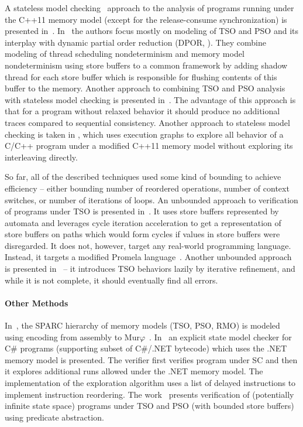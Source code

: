 A stateless model checking~\cite{Godefroid1997} approach to the analysis of programs running under the C++11 memory model (except for the release-consume synchronization) is presented in~\cite{Norris2013}.
In~\cite{Zhang2015} the authors focus mostly on modeling of TSO and PSO and its interplay with dynamic partial order reduction (DPOR, \cite{Flanagan2005dpor}).
They combine modeling of thread scheduling nondeterminism and memory model nondeterminism using store buffers to a common framework by adding shadow thread for each store buffer which is responsible for flushing contents of this buffer to the memory.
Another approach to combining TSO and PSO analysis with stateless model checking is presented in~\cite{Abdulla2015}.
The advantage of this approach is that for a program without relaxed behavior it should produce no additional traces compared to sequential consistency.
Another approach to stateless model checking is taken in \cite{Kokologiannakis2017}, which uses execution graphs to explore all behavior of a C/C++ program under a modified C++11 memory model without exploring its interleaving directly.

So far, all of the described techniques used some kind of bounding to achieve efficiency -- either bounding number of reordered operations, number of context switches, or number of iterations of loops.
An unbounded approach to verification of programs under TSO is presented in~\cite{Linden2010}.
It uses store buffers represented by automata and leverages cycle iteration acceleration to get a representation of store buffers on paths which would form cycles if values in store buffers were disregarded.
It does not, however, target any real-world programming language.
Instead, it targets a modified Promela language~\cite{Holzmann1997}.
Another unbounded approach is presented in~\cite{Bouajjani2015} -- it introduces TSO behaviors lazily by iterative refinement, and while it is not complete, it should eventually find all errors.

\paragraph{Other Methods}\label{other-methods}

In~\cite{Park1995}, the SPARC hierarchy of memory models (TSO, PSO, RMO) is modeled using encoding from assembly to Mur\(\varphi\)~\cite{Murphi}.
In~\cite{Huynh2006} an explicit state model checker for C\# programs (supporting subset of C\#/.NET bytecode) which uses the .NET memory model is presented.
The verifier first verifies program under SC and then it explores additional runs allowed under the .NET memory model.
The implementation of the exploration algorithm uses a list of delayed instructions to implement instruction reordering.
The work~\cite{Dan2013} presents verification of (potentially infinite state space) programs under TSO and PSO (with bounded store buffers) using predicate abstraction.

